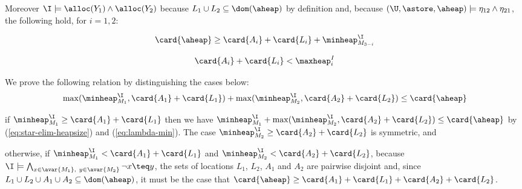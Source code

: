 {  Moreover $\I \models \alloc(Y_1) \wedge \alloc(Y_2)$ because $L_1
  \cup L_2 \subseteq \dom(\aheap)$ by definition and, because
  $(\U,\astore,\aheap) \models \eta_{12} \wedge \eta_{21}$, the
  following hold, for $i=1,2$:
  \begin{center}
    \begin{minipage}{6cm}
      \begin{equation}
        \card{\aheap} \geq \card{A_i} + \card{L_i} + \minheap^\I_{M_{3-i}} \label{eq:lambda-min}
      \end{equation}
    \end{minipage}
    \begin{minipage}{6cm}
      \begin{equation}
        \card{A_i} + \card{L_i} < \maxheap^I_i \label{eq:lambda-max}
      \end{equation}
    \end{minipage}
  \end{center}
  We prove the following relation by distinguishing the cases below:
  \begin{equation}\label{eq:max-max}
    \max(\minheap^\I_{M_1},\card{A_1} + \card{L_1}) +
    \max(\minheap^\I_{M_2},\card{A_2} + \card{L_2}) \leq \card{\aheap}
  \end{equation}
  \begin{compactenum}
  \item if $\minheap^\I_{M_1} \geq \card{A_1} + \card{L_1}$ then we
    have \(\minheap^\I_{M_1} + \max(\minheap^\I_{M_2},\card{A_2} +
    \card{L_2}) \leq \card{\aheap}\) by (\ref{eq:star-elim-heapsize})
    and (\ref{eq:lambda-min}). The case $\minheap^\I_{M_2} \geq
    \card{A_2} + \card{L_2}$ is symmetric, and
  \item otherwise, if $\minheap^\I_{M_1} < \card{A_1} + \card{L_1}$
    and $\minheap^\I_{M_2} < \card{A_2} + \card{L_2}$, because $\I
    \models \bigwedge_{x \in \avar{M_1},~ y \in \avar{M_2}} \neg
    x \teq y$, the sets of locations $L_1$, $L_2$, $A_1$ and $A_2$ are
    pairwise disjoint and, since $L_1 \cup L_2 \cup A_1 \cup A_2
    \subseteq \dom(\aheap)$, it must be the case that
    $\card{\aheap} \geq \card{A_1} + \card{L_1} + \card{A_2} +
    \card{L_2}$.
  \end{compactenum}
  \begin{figure}[thb]
    \vspace*{-\baselineskip}
    \centerline{}
    \caption{}\label{fig:heap-split}
    \vspace*{-\baselineskip}

\end{figure}}
